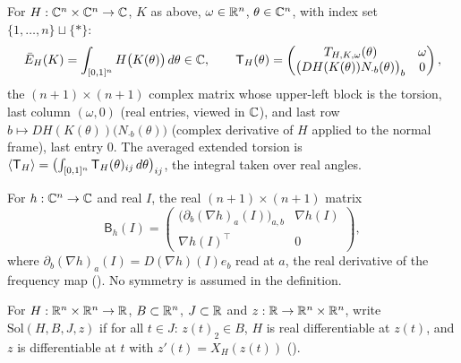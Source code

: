\begin{definition}\label{bpI:p0:extended}
For $H:\mathbb{C}^n\times\mathbb{C}^n\to\mathbb{C}$, $K$ as above, $\omega\in\mathbb{R}^n$, $\theta\in\mathbb{C}^n$, with index set $\{1,\dots,n\}\sqcup\{*\}$:
\[
\bar E_H(K)=\int_{[0,1]^n}H\bigl(K(\theta)\bigr)\,d\theta\in\mathbb{C},\qquad
\mathsf T_H(\theta)=\begin{pmatrix}T_{H,K,\omega}(\theta)&\omega\\ \bigl(DH(K(\theta))N_{\cdot b}(\theta)\bigr)_b&0\end{pmatrix},
\]
the $(n+1)\times(n+1)$ complex matrix whose upper-left block is the torsion, last column $(\omega,0)$ (real entries,
viewed in $\mathbb{C}$), and last row $b\mapsto DH(K(\theta))\bigl(N_{\cdot b}(\theta)\bigr)$ (complex derivative
of $H$ applied to the normal frame), last entry $0$. The averaged extended torsion is
$\langle \mathsf T_H\rangle=\bigl(\int_{[0,1]^n}\mathsf T_H(\theta)_{ij}\,d\theta\bigr)_{ij}$, the integral taken over real angles.
\end{definition}

\begin{definition}\label{bpI:p0:bordered}
For $h:\mathbb{C}^n\to\mathbb{C}$ and real $I$, the real $(n+1)\times(n+1)$ matrix
\[
\mathsf B_h(I)=\begin{pmatrix}\bigl(\partial_b(\nabla h)_a(I)\bigr)_{a,b}&\nabla h(I)\\ \nabla h(I)^\top&0\end{pmatrix},
\]
where $\partial_b(\nabla h)_a(I)=D(\nabla h)(I)e_b$ read at $a$, the real derivative of the frequency map
(). No symmetry is assumed in the definition.
\end{definition}

\begin{definition}\label{bpI:p0:hamsol}
For $H:\mathbb{R}^n\times\mathbb{R}^n\to\mathbb{R}$, $B\subset\mathbb{R}^n$, $J\subset\mathbb{R}$ and $z:\mathbb{R}\to\mathbb{R}^n\times\mathbb{R}^n$, write
$\mathrm{Sol}(H,B,J,z)$ if for all $t\in J$: $z(t)_2\in B$, $H$ is real differentiable at $z(t)$, and $z$ is
differentiable at $t$ with $z'(t)=X_H(z(t))$ ().
\end{definition}


